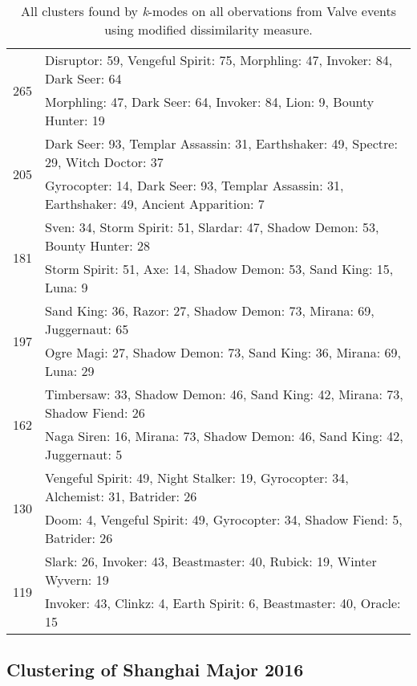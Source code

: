 \documentclass[result.tex]{subfiles}
\begin{document}
\begin{table}[H]
\begin{tabular}{ | c | p{12.5cm} | }
    \hline
    \multirow{2}{*}{265}
    & Disruptor: 59, Vengeful Spirit: 75, Morphling: 47, Invoker: 84, Dark Seer: 64 \\
    & Morphling: 47, Dark Seer: 64, Invoker: 84, Lion: 9, Bounty Hunter: 19 \\
    \hline
    \multirow{2}{*}{205}
    & Dark Seer: 93, Templar Assassin: 31, Earthshaker: 49, Spectre: 29, Witch Doctor: 37 \\
    & Gyrocopter: 14, Dark Seer: 93, Templar Assassin: 31, Earthshaker: 49, Ancient Apparition: 7 \\
    \hline
    \multirow{2}{*}{181}
    & Sven: 34, Storm Spirit: 51, Slardar: 47, Shadow Demon: 53, Bounty Hunter: 28 \\
    & Storm Spirit: 51, Axe: 14, Shadow Demon: 53, Sand King: 15, Luna: 9 \\
    \hline
    \multirow{2}{*}{197}
    & Sand King: 36, Razor: 27, Shadow Demon: 73, Mirana: 69, Juggernaut: 65 \\
    & Ogre Magi: 27, Shadow Demon: 73, Sand King: 36, Mirana: 69, Luna: 29 \\
    \hline
    \multirow{2}{*}{162}
    & Timbersaw: 33, Shadow Demon: 46, Sand King: 42, Mirana: 73, Shadow Fiend: 26 \\
    & Naga Siren: 16, Mirana: 73, Shadow Demon: 46, Sand King: 42, Juggernaut: 5 \\
    \hline
    \multirow{2}{*}{130}
    & Vengeful Spirit: 49, Night Stalker: 19, Gyrocopter: 34, Alchemist: 31, Batrider: 26 \\
    & Doom: 4, Vengeful Spirit: 49, Gyrocopter: 34, Shadow Fiend: 5, Batrider: 26 \\
    \hline
    \multirow{2}{*}{119}
    & Slark: 26, Invoker: 43, Beastmaster: 40, Rubick: 19, Winter Wyvern: 19 \\
    & Invoker: 43, Clinkz: 4, Earth Spirit: 6, Beastmaster: 40, Oracle: 15 \\
    \hline
  \end{tabular}
  \caption{All clusters found by \textit{k}-modes on all obervations from Valve events using modified dissimilarity measure.}
  \label{tab:cl_app_all_kmodes_mod}
\end{table}

\newpage

\subsection*{Clustering of Shanghai Major 2016}
\end{document}
